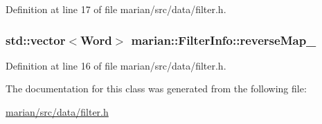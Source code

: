 Definition at line 17 of file marian/src/data/filter.\+h.

\subsubsection[{\texorpdfstring{reverse\+Map\+\_\+}{reverseMap_}}]{\setlength{\rightskip}{0pt plus 5cm}std\+::vector$<${\bf Word}$>$ marian\+::\+Filter\+Info\+::reverse\+Map\+\_\+\hspace{0.3cm}{\ttfamily [private]}}\hypertarget{classmarian_1_1FilterInfo_a18e06a5f0cb4ae6ab7e1505a47c6f4a0}{}\label{classmarian_1_1FilterInfo_a18e06a5f0cb4ae6ab7e1505a47c6f4a0}


Definition at line 16 of file marian/src/data/filter.\+h.



The documentation for this class was generated from the following file\+:\begin{DoxyCompactItemize}
\item 
\hyperlink{marian_2src_2data_2filter_8h}{marian/src/data/filter.\+h}\end{DoxyCompactItemize}
